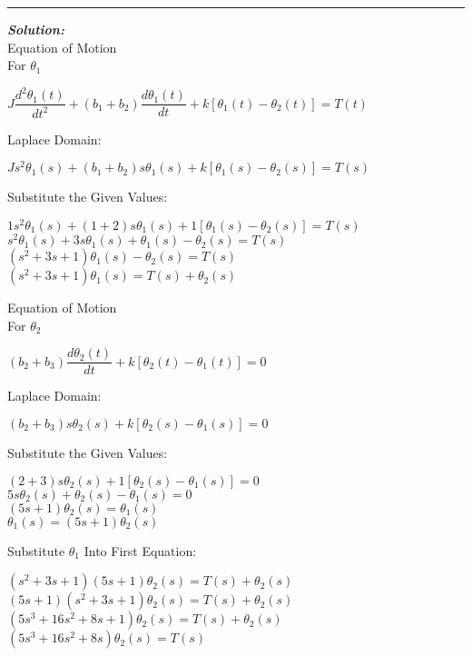 \documentclass[11pt,letterpaper]{article}
\begin{document}
\rule{\textwidth}{1pt}
\vspace{12pt}
\textit{\textbf{Solution:}}\\
Equation of Motion\\[12pt]
For $\theta_1$\\
\begin{center}
	$J\dfrac{d^2\theta_1(t)}{dt^2}+(b_1+b_2)\dfrac{d\theta_1(t)}{dt}+k[\theta_1(t)-\theta_2(t)]=T(t)$\\
\end{center}
Laplace Domain:\\
\begin{center}
	$Js^2\theta_1(s)+(b_1+b_2)s\theta_1(s)+k[\theta_1(s)-\theta_2(s)]=T(s)$\\
\end{center}
Substitute the Given Values:\\
\begin{center}
	$1s^2\theta_1(s)+(1+2)s\theta_1(s)+1[\theta_1(s)-\theta_2(s)]=T(s)$\\[12pt]
	$s^2\theta_1(s)+3s\theta_1(s)+\theta_1(s)-\theta_2(s)=T(s)$\\[12pt]
	$(s^2+3s+1)\theta_1(s)-\theta_2(s)=T(s)$\\[12pt]
	$(s^2+3s+1)\theta_1(s)=T(s)+\theta_2(s)$\\
\end{center}
Equation of Motion\\[12pt]
For $\theta_2$\\
\begin{center}
	$(b_2+b_3)\dfrac{d\theta_2(t)}{dt}+k[\theta_2(t)-\theta_1(t)]=0$\\
\end{center}
Laplace Domain:\\
\begin{center}
	$(b_2+b_3)s\theta_2(s)+k[\theta_2(s)-\theta_1(s)]=0$\\
\end{center}
Substitute the Given Values:\\
\begin{center}
	$(2+3)s\theta_2(s)+1[\theta_2(s)-\theta_1(s)]=0$\\[12pt]
	$5s\theta_2(s)+\theta_2(s)-\theta_1(s)=0$\\[12pt]
	$(5s+1)\theta_2(s)=\theta_1(s)$\\[12pt]
	$\theta_1(s)=(5s+1)\theta_2(s)$\\[12pt]
\end{center}
Substitute $\theta_1$ Into First Equation:\\
\begin{center}
	$(s^2+3s+1)(5s+1)\theta_2(s)=T(s)+\theta_2(s)$\\[12pt]
	$(5s+1)(s^2+3s+1)\theta_2(s)=T(s)+\theta_2(s)$\\[12pt]
	$(5s^3+16s^2+8s+1)\theta_2(s)=T(s)+\theta_2(s)$\\[12pt]
	$(5s^3+16s^2+8s)\theta_2(s)=T(s)$\\[12pt]
\end{center}
\end{document}
